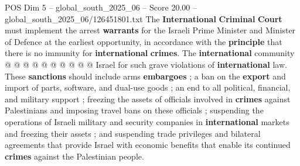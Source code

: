 \begin{textsample}{POS Dim 5 – global\_south\_2025\_06 – Score 20.00 – global\_south\_2025\_06/126451801.txt}
The \textbf{International} \textbf{Criminal} \textbf{Court} must implement the arrest \textbf{warrants} for the Israeli Prime Minister and Minister of Defence at the earliest opportunity, in accordance with the \textbf{principle} that there is no immunity for \textbf{international} \textbf{crimes}.
The \textbf{international} community @ @ @ @ @ @ @ @ @ @ Israel for such grave violations of \textbf{international} law.
These \textbf{sanctions} should include arms \textbf{embargoes} ; a ban on the \textbf{export} and import of parts, software, and dual-use goods ; an end to all political, financial, and military support ; freezing the assets of officials involved in \textbf{crimes} against Palestinians and imposing travel bans on these officials ; suspending the operations of Israeli military and security companies in \textbf{international} markets and freezing their assets ; and suspending trade privileges and bilateral agreements that provide Israel with economic benefits that enable its continued \textbf{crimes} against the Palestinian people.

\end{textsample}
